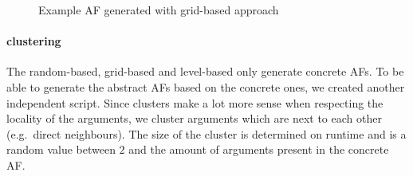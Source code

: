 \begin{figure}[h]
\begin{minipage}{.5\textwidth}
    \label{af:ImplementationLevelBasedExampleAFsb}
\end{minipage}%
\caption{Example AF generated with grid-based approach}
\label{fig:ImplementationLevelBasedExampleAFs}
\end{figure}

\paragraph{clustering} The random-based, grid-based and level-based only generate concrete AFs. To be able to generate the abstract AFs based on the concrete ones, we created another independent script. Since clusters make a lot more sense when respecting the locality of the arguments, we cluster arguments which are next to each other (e.g.\ direct neighbours). The size of the cluster is determined on runtime and is a random value between $2$ and the amount of arguments present in the concrete AF.


\newpage
